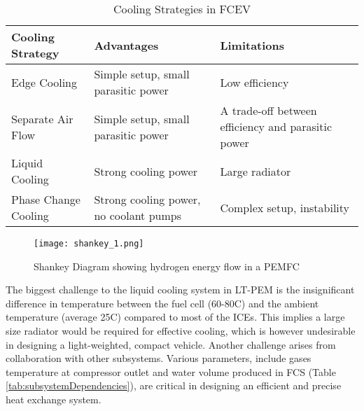 \documentclass[a4paper,11pt]{article}
\begin{document}
\begin{table}[h!]
    \centering
    \begin{tabular}{|p{}|p{}||p{}|} %
    \hline
    Cooling Strategy & Advantages & Limitations \\ [0.5ex] 
    \hline\hline
    Edge Cooling & Simple setup, small parasitic power & Low efficiency \\
    \hline
    Separate Air Flow & Simple setup, small parasitic power & A trade-off between efficiency and parasitic power \\
    \hline
    Liquid Cooling & Strong cooling power & Large radiator \\
    \hline
    Phase Change Cooling & Strong cooling power, no coolant pumps & Complex setup, instability \\
    \hline
    \end{tabular}
    \caption{Cooling Strategies in FCEV}
    \label{tab:coolingStrats}
\end{table}

\begin{figure}[h]
    \texttt{[image: shankey\_1.png]}
    \caption{Shankey Diagram showing hydrogen energy flow in a PEMFC\cite{nguyen2020proton}}
    \centering
    \label{fig:sangkyEnergy}  
\end{figure}

The biggest challenge to the liquid cooling system in LT-PEM is the insignificant difference in temperature between the fuel cell (60-80\degree C) and the ambient temperature (average 25\degree C) compared to most of the ICEs\cite{islamnanofluid}. This implies a large size radiator would be required for effective cooling, which is however undesirable in designing a light-weighted, compact vehicle. Another challenge arises from collaboration with other subsystems. Various parameters, include gases temperature at compressor outlet and water volume produced in FCS (Table \ref{tab:subsystemDependencies}), are critical in designing an efficient and precise heat exchange system.
\end{document}
